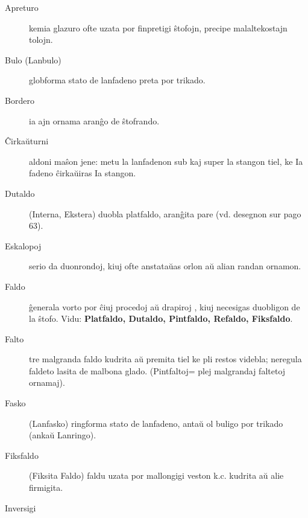 \begin{description}
\item[Apreturo]

 kemia glazuro ofte uzata por finpretigi ŝtofojn, precipe malaltekostajn tolojn.

\item[Bulo (Lanbulo)]

 globforma stato de lanfadeno preta por trikado.

\item[Bordero]

 ia ajn ornama aranĝo de ŝtofrando.

\item[Ĉirkaŭturni]

 aldoni maŝon jene: metu la lanfadenon sub kaj super la stangon tiel, ke Ia fadeno ĉirkaŭiras Ia stangon.

\item[Dutaldo]

(Interna, Ekstera) duobla platfaldo, aranĝita pare (vd. desegnon sur pago 63).

\item[\ast\space Eskalopoj]

 serio da duonrondoj, kiuj ofte anstataŭas orlon aŭ alian randan ornamon.

\item[Faldo]

 ĝenerala vorto por ĉiuj procedoj aŭ drapiroj , kiuj necesigas duobligon de la ŝtofo. Vidu: \textbf{Platfaldo, Dutaldo, Pintfaldo, Refaldo, Fiksfaldo}.

\item[Falto]

 tre malgranda faldo kudrita aŭ premita tiel ke pli restos videbla; neregula faldeto lasita de malbona glado. (Pintfaltoj= plej malgrandaj faltetoj ornamaj).

\item[Fasko]

 (Lanfasko) ringforma stato de lanfadeno, antaŭ ol buligo por trikado (ankaŭ Lanringo).

\item[Fiksfaldo]

 (Fiksita Faldo) faldu uzata por mallongigi veston k.c. kudrita aŭ alie firmigita.

\item[Inversigi]


\end{description}
